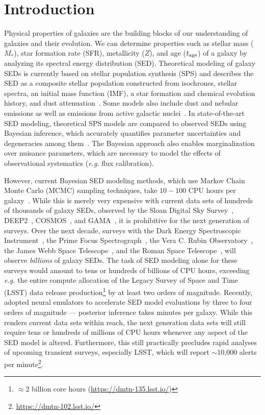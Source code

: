 \section{Introduction} \label{sec:intro} 
Physical properties of galaxies are the building
blocks of our understanding of galaxies and their evolution. 
We can determine properties such as stellar mass ($M_*$), star formation rate (SFR), metallicity
($Z$), and age ($t_{\rm age}$) of a galaxy by analyzing its
spectral energy distribution (SED).
Theoretical modeling of galaxy SEDs is currently based on stellar population
synthesis (SPS) and describes the SED as a composite stellar population
constructed
from isochrones, stellar spectra, an initial mass function (IMF), a star
formation and chemical evolution history, and dust
attenuation~\citep[\emph{e.g.}][see \citealt{walcher2011, conroy2013} for a
comprehensive review]{bruzual2003, maraston2005, conroy2009}.
Some models also include dust and nebular emissions as well as emissions from
active galactic nuclei~\citep[\emph{e.g.}][]{johnson2021}.
In state-of-the-art SED modeling, theoretical SPS models are compared to
observed SEDs using Bayesian inference, which accurately quantifies parameter
uncertainties and degeneracies among them~\citep{acquaviva2011,
chevallard2016, leja2017, carnall2018, johnson2021, hahn2022}. 
The Bayesian approach also enables marginalization over nuisance parameters,
which are necessary to model the effects of observational systematics
(\emph{e.g.} flux calibration).

However, current Bayesian SED modeling methods, which use Markov Chain Monte
Carlo (MCMC) sampling techniques, take $10-100$ CPU hours per
galaxy~\citep[\emph{e.g.}][]{carnall2019a, tacchella2021}. 
While this is merely very expensive with current data sets of hundreds of
thousands of galaxy SEDs, observed by the Sloan Digital Sky
Survey~\citep[SDSS;][]{york2000}, DEEP2~\citep{davis2003},
COSMOS~\citep{scoville2007}, and GAMA~\citep{baldry2018}, it is prohibitive for
the next generation of surveys.
Over the next decade, surveys with the 
Dark Energy Spectroscopic Instrument~\citep[DESI;][]{desicollaboration2016},
the Prime Focus Spectrograph~\citep[PFS;][]{takada2014}, 
the Vera C. Rubin Observatory~\citep{ivezic2019}, 
the James Webb Space Telescope~\citep{gardner2006},
and the Roman Space Telescope~\citep{spergel2015}, will observe \emph{billions}
of galaxy SEDs.
The task of SED modeling alone for these surveys would amount to tens or
hundreds of billions of CPU hours, exceeding \emph{e.g.} the entire compute
allocation of the Legacy Survey of Space and Time (LSST) data release
production\footnote{$\approx$2 billion core hours
(\url{https://dmtn-135.lsst.io/})} by at least two orders of magnitude.
Recently, \cite{alsing2020} adopted neural emulators to accelerate SED model
evaluations by three to four orders of magnitude --- posterior inference takes
minutes per galaxy.
While this renders current data sets within reach, the next generation data
sets will still require tens or hundreds of millions of CPU hours whenever any
aspect of the SED model is altered.
Furthermore, this still practically precludes rapid analyses of upcoming
transient surveys, especially LSST, which will report $\sim$10,000 alerts per
minute\footnote{\url{https://dmtn-102.lsst.io/}}.

